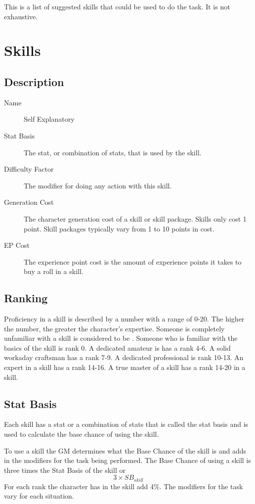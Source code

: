 This is a list of suggested skills that could be used to do the task. 
It is not exhaustive.

\section{Skills}
\subsection{Description}

\begin{description}
	\item[Name] 
	Self Explanatory
	\item[Stat Basis] 
	The stat, or combination of stats, that is used by the skill. 
	\item[Difficulty Factor] 
	The modifier for doing any action with this skill.
	\item[Generation Cost]
	The character generation cost of a skill or skill package. Skills
	only cost 1 point. Skill packages typically vary from 1
	to 10 points in cost.
	\item[EP Cost] 
	The experience point cost is the amount of experience points it takes to
	buy a roll in a skill. 
\end{description}

\subsection{Ranking}

Proficiency in a skill is described by a number with a range of 0-20.
The higher the number, the greater the character's expertise. Someone
is completely unfamiliar with a skill is considered to be
. Someone who is familiar with the basics of
the skill is rank 0. A dedicated amateur is has a rank 4-6. A
solid workaday craftsman has a rank 7-9. A dedicated professional is rank 
10-13. An expert in a skill has a rank 14-16. A true master of a skill has 
a rank 14-20 in a skill. 

\subsection{Stat Basis}

Each skill has a stat or a combination of stats that is called the 
stat basis and is used to calculate the base chance of using the 
skill. 

To use a skill the GM determines what the Base Chance of the skill is 
and adds in the modifiers for the task being performed.
The Base Chance of using a skill is three times the Stat Basis of the skill
or \[ 3 \times SB_{skill} \] For each rank the character has in the skill add 4\%.
The modifiers for the task vary for each situation.

